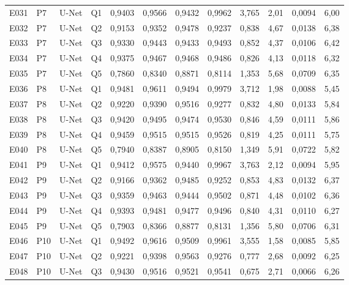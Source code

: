 \begin{longtable}{lllllccccccc}
E031 & P7 & U-Net & Q1 & 0{,}9403 & 0{,}9566 & 0{,}9432 & 0{,}9962 & 3{,}765 & 2{,}01 & 0{,}0094 & 6{,}00 \\
E032 & P7 & U-Net & Q2 & 0{,}9153 & 0{,}9352 & 0{,}9478 & 0{,}9237 & 0{,}838 & 4{,}67 & 0{,}0138 & 6{,}38 \\
E033 & P7 & U-Net & Q3 & 0{,}9330 & 0{,}9443 & 0{,}9433 & 0{,}9493 & 0{,}852 & 4{,}37 & 0{,}0106 & 6{,}42 \\
E034 & P7 & U-Net & Q4 & 0{,}9375 & 0{,}9467 & 0{,}9468 & 0{,}9486 & 0{,}826 & 4{,}13 & 0{,}0118 & 6{,}32 \\
E035 & P7 & U-Net & Q5 & 0{,}7860 & 0{,}8340 & 0{,}8871 & 0{,}8114 & 1{,}353 & 5{,}68 & 0{,}0709 & 6{,}35 \\
E036 & P8 & U-Net & Q1 & 0{,}9481 & 0{,}9611 & 0{,}9494 & 0{,}9979 & 3{,}712 & 1{,}98 & 0{,}0088 & 5{,}45 \\
E037 & P8 & U-Net & Q2 & 0{,}9220 & 0{,}9390 & 0{,}9516 & 0{,}9277 & 0{,}832 & 4{,}80 & 0{,}0133 & 5{,}84 \\
E038 & P8 & U-Net & Q3 & 0{,}9420 & 0{,}9495 & 0{,}9474 & 0{,}9530 & 0{,}846 & 4{,}59 & 0{,}0111 & 5{,}86 \\
E039 & P8 & U-Net & Q4 & 0{,}9459 & 0{,}9515 & 0{,}9515 & 0{,}9526 & 0{,}819 & 4{,}25 & 0{,}0111 & 5{,}75 \\
E040 & P8 & U-Net & Q5 & 0{,}7940 & 0{,}8387 & 0{,}8905 & 0{,}8150 & 1{,}349 & 5{,}91 & 0{,}0722 & 5{,}82 \\
E041 & P9 & U-Net & Q1 & 0{,}9412 & 0{,}9575 & 0{,}9440 & 0{,}9967 & 3{,}763 & 2{,}12 & 0{,}0094 & 5{,}95 \\
E042 & P9 & U-Net & Q2 & 0{,}9166 & 0{,}9362 & 0{,}9485 & 0{,}9252 & 0{,}853 & 4{,}83 & 0{,}0132 & 6{,}37 \\
E043 & P9 & U-Net & Q3 & 0{,}9359 & 0{,}9463 & 0{,}9444 & 0{,}9502 & 0{,}871 & 4{,}48 & 0{,}0102 & 6{,}36 \\
E044 & P9 & U-Net & Q4 & 0{,}9393 & 0{,}9481 & 0{,}9477 & 0{,}9496 & 0{,}840 & 4{,}31 & 0{,}0110 & 6{,}27 \\
E045 & P9 & U-Net & Q5 & 0{,}7903 & 0{,}8366 & 0{,}8877 & 0{,}8131 & 1{,}356 & 5{,}80 & 0{,}0706 & 6{,}31 \\
E046 & P10 & U-Net & Q1 & 0{,}9492 & 0{,}9616 & 0{,}9509 & 0{,}9961 & 3{,}555 & 1{,}58 & 0{,}0085 & 5{,}85 \\
E047 & P10 & U-Net & Q2 & 0{,}9221 & 0{,}9398 & 0{,}9563 & 0{,}9276 & 0{,}777 & 2{,}68 & 0{,}0092 & 6{,}25 \\
E048 & P10 & U-Net & Q3 & 0{,}9430 & 0{,}9516 & 0{,}9521 & 0{,}9541 & 0{,}675 & 2{,}71 & 0{,}0066 & 6{,}26 \\

\end{longtable}
